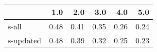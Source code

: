 \begin{tabular}{lrrrrr}
\toprule
{} &  1.0 &  2.0 &  3.0 &  4.0 &  5.0 \\
\midrule
s-all     & 0.48 & 0.41 & 0.35 & 0.26 & 0.24 \\
s-updated & 0.48 & 0.39 & 0.32 & 0.25 & 0.23 \\
\bottomrule
\end{tabular}
